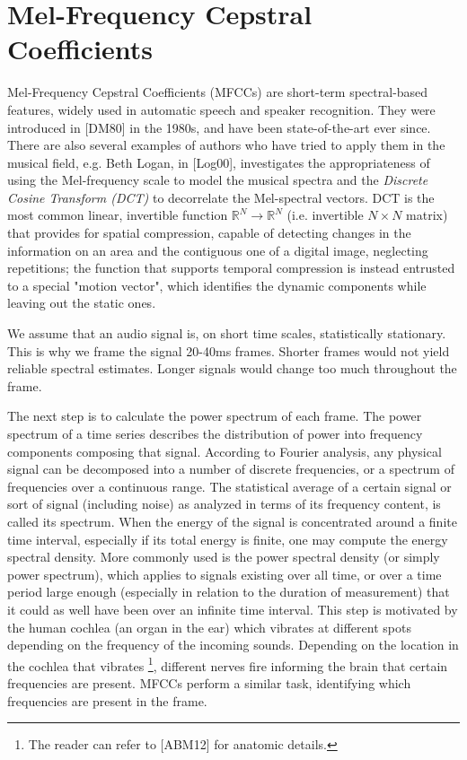 \documentclass[english, LaM, oneside, noexaminfo]{sapthesis}
\begin{document}
\section{Mel-Frequency Cepstral Coefficients}
\label{MFCCs}
Mel-Frequency Cepstral Coefficients (MFCCs) are short-term spectral-based features, widely used in automatic speech and speaker recognition. They were introduced in [DM80] in the 1980s, and have been state-of-the-art ever since. There are also several examples of authors who have tried to apply them in the musical field, e.g. Beth Logan, in [Log00], investigates the appropriateness of using the Mel-frequency scale to model the musical spectra and the \textit{Discrete Cosine Transform (DCT)} to decorrelate the Mel-spectral vectors. DCT is the most common linear, invertible function $\mathbb{R}^N \rightarrow \mathbb{R}^N$ (i.e. invertible $N \times N$ matrix) that provides for spatial compression, capable of detecting changes in the information on an area and the contiguous one of a digital image, neglecting repetitions; the function that supports temporal compression is instead entrusted to a special "motion vector", which identifies the dynamic components while leaving out the static ones.

We assume that an audio signal is, on short time scales, statistically stationary. This is why we frame the signal 20-40ms frames. Shorter frames would not yield reliable spectral estimates. Longer signals would change too much throughout the frame.

The next step is to calculate the power spectrum of each frame. The power spectrum of a time series describes the distribution of power into frequency components composing that signal. According to Fourier analysis, any physical signal can be decomposed into a number of discrete frequencies, or a spectrum of frequencies over a continuous range. The statistical average of a certain signal or sort of signal (including noise) as analyzed in terms of its frequency content, is called its spectrum.
When the energy of the signal is concentrated around a finite time interval, especially if its total energy is finite, one may compute the energy spectral density. More commonly used is the power spectral density (or simply power spectrum), which applies to signals existing over all time, or over a time period large enough (especially in relation to the duration of measurement) that it could as well have been over an infinite time interval. This step is motivated by the human cochlea (an organ in the ear) which vibrates at different spots depending on the frequency of the incoming sounds. Depending on the location in the cochlea that vibrates \footnote{The reader can refer to [ABM12] for anatomic details.}, different nerves fire informing the brain that certain frequencies are present. MFCCs perform a similar task, identifying which frequencies are present in the frame.
\end{document}
